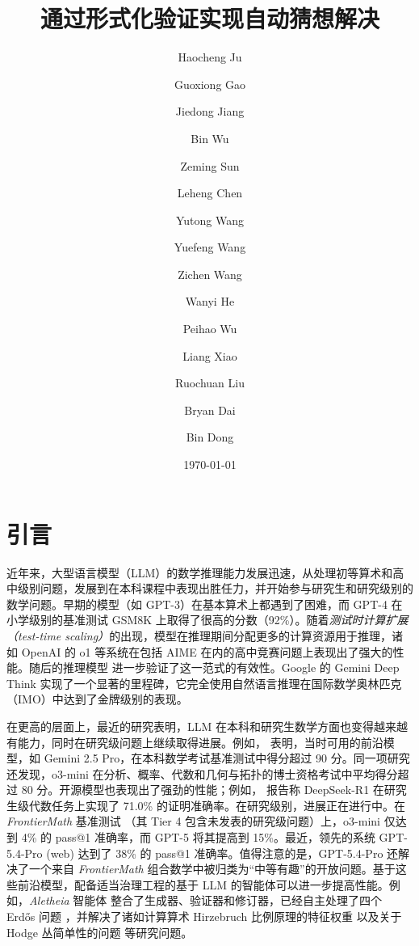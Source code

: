 \documentclass[]{pkuai4m}
\title{通过形式化验证实现自动猜想解决}
\author[1,5,\dagger,*]{Haocheng Ju}
\author[1,5,\ddagger,*]{Guoxiong Gao}
\author[2,*]{Jiedong Jiang}
\author[4,10,*]{Bin Wu}
\author[1,3,*]{Zeming Sun}
\author[1,5,10]{Leheng Chen}
\author[1,5]{Yutong Wang}
\author[1]{Yuefeng Wang}
\author[1,5]{Zichen Wang}
\author[1,5]{Wanyi He}
\author[5]{Peihao Wu}
\author[6]{Liang Xiao}
\author[6]{Ruochuan Liu}
\author[5,\P]{Bryan Dai}
\author[7,8,9,10\P]{Bin Dong}
\affiliation[]{
$^{1}$北京大学数学科学学院 \\
$^{2}$西湖大学理论科学研究院 \\
$^{3}$京都大学数理解析研究所 \\
$^{4}$天津大学数学学院 \\
$^{5}$IQuest Research \\
$^{6}$北京大学数学科学学院，新基石科学实验室 \\
$^{7}$北京大学北京国际数学研究中心及新基石科学实验室 \\
$^{8}$北京大学机器学习研究中心\\
$^{9}$大湾区大学（筹）智能计算中心 \\
$^{10}$中关村研究院 \\
}
\date{\today}
\theoremstyle{plain}
\theoremstyle{definition}
\begin{document}
\maketitle

\renewcommand{\thefootnote}{\fnsymbol{footnote}} 
\setcounter{footnote}{0}

% 

\renewcommand{\thefootnote}{\arabic{footnote}}
\pagestyle{fancy}
\fancyhf{}
\fancyhead[R]{\thepage}


\section{引言}

近年来，大型语言模型（LLM）的数学推理能力发展迅速，从处理初等算术和高中级别问题，发展到在本科课程中表现出胜任力，并开始参与研究生和研究级别的数学问题。早期的模型（如 GPT-3）在基本算术上都遇到了困难，而 GPT-4 \cite{achiam2023gpt} 在小学级别的基准测试 GSM8K 上取得了很高的分数（92\%）。随着\textit{测试时计算扩展（test-time scaling）}的出现，模型在推理期间分配更多的计算资源用于推理，诸如 OpenAI 的 o1 等系统在包括 AIME 在内的高中竞赛问题上表现出了强大的性能。随后的推理模型 \cite{guo2025deepseek,qwq32b,yang2025qwen3,comanici2025gemini} 进一步验证了这一范式的有效性。Google 的 Gemini Deep Think 实现了一个显著的里程碑，它完全使用自然语言推理在国际数学奥林匹克（IMO）中达到了金牌级别的表现。

在更高的层面上，最近的研究表明，LLM 在本科和研究生数学方面也变得越来越有能力，同时在研究级问题上继续取得进展。例如，\cite{ju2026ai} 表明，当时可用的前沿模型，如 Gemini 2.5 Pro，在本科数学考试基准测试中得分超过 90 分。同一项研究还发现，o3-mini 在分析、概率、代数和几何与拓扑的博士资格考试中平均得分超过 80 分。开源模型也表现出了强劲的性能；例如，\cite{jiang2025fate} 报告称 DeepSeek-R1 在研究生级代数任务上实现了 71.0\% 的证明准确率。在研究级别，进展正在进行中。在 \textit{FrontierMath} 基准测试 \cite{glazer2024frontiermath}（其 Tier 4 包含未发表的研究级问题）上，o3-mini 仅达到 4\% 的 pass@1 准确率，而 GPT-5 将其提高到 15\%。最近，领先的系统 GPT-5.4-Pro (web) 达到了 38\% 的 pass@1 准确率。值得注意的是，GPT-5.4-Pro 还解决了一个来自 \textit{FrontierMath} 组合数学中被归类为“中等有趣”的开放问题。基于这些前沿模型，配备适当治理工程的基于 LLM 的智能体可以进一步提高性能。例如，\textit{Aletheia} 智能体 \cite{feng2026towards} 整合了生成器、验证器和修订器，已经自主处理了四个 Erdős 问题 \cite{feng2026semi}，并解决了诸如计算算术 Hirzebruch 比例原理的特征权重 \cite{feng2026eigenweights} 以及关于 Hodge 丛简单性的问题 \cite{patel2026simplicity} 等研究问题。
\end{document}
